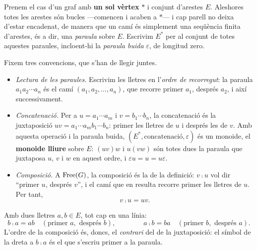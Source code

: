 \begin{exemple}\label{ex:monoide-lliure-cat}
Prenem el cas d'un graf amb \textbf{un sol vèrtex} $\ast$ i conjunt d'arestes $E$. Aleshores totes les arestes són bucles ---comencen i acaben a $\ast$--- i cap parell no deixa d'estar encadenat, de manera que un camí és simplement una seqüència finita d'arestes, és a dir, una \emph{paraula} sobre $E$. Escrivim $E^*$ per al conjunt de totes aquestes paraules, incloent-hi la \emph{paraula buida} $\varepsilon$, de longitud zero.

Fixem tres convencions, que s'han de llegir juntes.
\begin{itemize}
\item \emph{Lectura de les paraules.} Escrivim les lletres en l'\emph{ordre de recorregut}: la paraula $a_1a_2\cdots a_n$ és el camí $(a_1,a_2,\dots,a_n)$, que recorre primer $a_1$, després $a_2$, i així successivament.
\item \emph{Concatenació.} Per a $u=a_1\cdots a_m$ i $v=b_1\cdots b_n$, la concatenació és la juxtaposició $uv=a_1\cdots a_m b_1\cdots b_n$: primer les lletres de $u$ i després les de $v$. Amb aquesta operació i la paraula buida, $(E^*,\text{concatenació},\varepsilon)$ és un monoide, el \textbf{monoide lliure} sobre $E$: $(uv)w$ i $u(vw)$ són totes dues la paraula que juxtaposa $u$, $v$ i $w$ en aquest ordre, i $\varepsilon u=u=u\varepsilon$.
\item \emph{Composició.} A $\operatorname{Free}(G)$, la composició és la de la definició: $v\comp u$ vol dir \enquote{primer $u$, després $v$}, i el camí que en resulta recorre primer les lletres de $u$. Per tant,
\[
v\comp u=uv.
\]
\end{itemize}
Amb dues lletres $a,b\in E$, tot cap en una línia:
\[
b\comp a=ab\quad(\text{primer }a,\text{ després }b),
\qquad\qquad
a\comp b=ba\quad(\text{primer }b,\text{ després }a).
\]
L'ordre de la composició és, doncs, el \emph{contrari} del de la juxtaposició: el símbol de la dreta a $b\comp a$ és el que s'escriu primer a la paraula.


\end{exemple}
